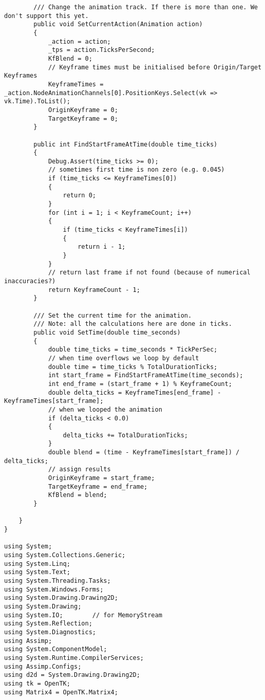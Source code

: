 \begin{scriptsize}
\begin{verbatim}
        /// Change the animation track. If there is more than one. We don't support this yet.
        public void SetCurrentAction(Animation action)
        {
            _action = action;
            _tps = action.TicksPerSecond;
            KfBlend = 0; 
            // Keyframe times must be initialised before Origin/Target Keyframes
            KeyframeTimes = _action.NodeAnimationChannels[0].PositionKeys.Select(vk => vk.Time).ToList();
            OriginKeyframe = 0;
            TargetKeyframe = 0;
        }

        public int FindStartFrameAtTime(double time_ticks)
        {
            Debug.Assert(time_ticks >= 0);
            // sometimes first time is non zero (e.g. 0.045)
            if (time_ticks <= KeyframeTimes[0])
            {
                return 0;
            }
            for (int i = 1; i < KeyframeCount; i++)
            {
                if (time_ticks < KeyframeTimes[i])
                {
                    return i - 1;
                }
            }
            // return last frame if not found (because of numerical inaccuracies?)
            return KeyframeCount - 1;
        }

        /// Set the current time for the animation.
        /// Note: all the calculations here are done in ticks.
        public void SetTime(double time_seconds)
        {            
            double time_ticks = time_seconds * TickPerSec;
            // when time overflows we loop by default
            double time = time_ticks % TotalDurationTicks;
            int start_frame = FindStartFrameAtTime(time_seconds);
            int end_frame = (start_frame + 1) % KeyframeCount;
            double delta_ticks = KeyframeTimes[end_frame] - KeyframeTimes[start_frame];
            // when we looped the animation
            if (delta_ticks < 0.0)
            {
                delta_ticks += TotalDurationTicks;
            }
            double blend = (time - KeyframeTimes[start_frame]) / delta_ticks;
            // assign results
            OriginKeyframe = start_frame;
            TargetKeyframe = end_frame;
            KfBlend = blend;
        }

    }
}

using System;
using System.Collections.Generic;
using System.Linq;
using System.Text;
using System.Threading.Tasks;
using System.Windows.Forms;
using System.Drawing.Drawing2D;
using System.Drawing;
using System.IO;        // for MemoryStream
using System.Reflection;
using System.Diagnostics;
using Assimp;
using System.ComponentModel;
using System.Runtime.CompilerServices;
using Assimp.Configs;
using d2d = System.Drawing.Drawing2D;
using tk = OpenTK;
using Matrix4 = OpenTK.Matrix4;


\end{verbatim}
\end{scriptsize}
